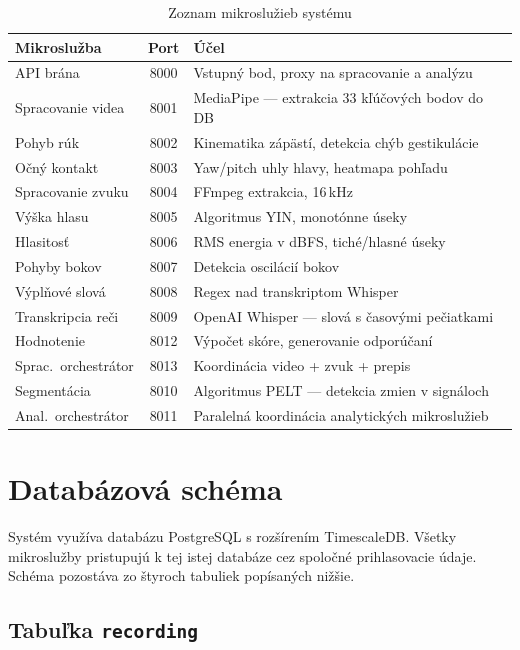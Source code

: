 \begin{table}[ht]
\centering
\caption{Zoznam mikroslužieb systému}
\label{tab:td-microservices}
\begin{tabular}{|l|c|l|}
\hline
\textbf{Mikroslužba} & \textbf{Port} & \textbf{Účel} \\
\hline
API brána & 8000 & Vstupný bod, proxy na spracovanie a analýzu \\
Spracovanie videa & 8001 & MediaPipe — extrakcia 33 kľúčových bodov do DB \\
Pohyb rúk & 8002 & Kinematika zápästí, detekcia chýb gestikulácie \\
Očný kontakt & 8003 & Yaw/pitch uhly hlavy, heatmapa pohľadu \\
Spracovanie zvuku & 8004 & FFmpeg extrakcia, 16\,kHz \\
Výška hlasu & 8005 & Algoritmus YIN, monotónne úseky \\
Hlasitosť & 8006 & RMS energia v dBFS, tiché/hlasné úseky \\
Pohyby bokov & 8007 & Detekcia oscilácií bokov \\
Výplňové slová & 8008 & Regex nad transkriptom Whisper \\
Transkripcia reči & 8009 & OpenAI Whisper — slová s časovými pečiatkami \\
Hodnotenie & 8012 & Výpočet skóre, generovanie odporúčaní \\
Sprac.\ orchestrátor & 8013 & Koordinácia video + zvuk + prepis \\
Segmentácia & 8010 & Algoritmus PELT — detekcia zmien v signáloch \\
Anal.\ orchestrátor & 8011 & Paralelná koordinácia analytických mikroslužieb \\
\hline
\end{tabular}
\end{table}

\section{Databázová schéma}

Systém využíva databázu PostgreSQL s rozšírením TimescaleDB. Všetky mikroslužby pristupujú k tej istej databáze cez spoločné prihlasovacie údaje. Schéma pozostáva zo štyroch tabuliek popísaných nižšie.

\subsection{Tabuľka \texttt{recording}}

